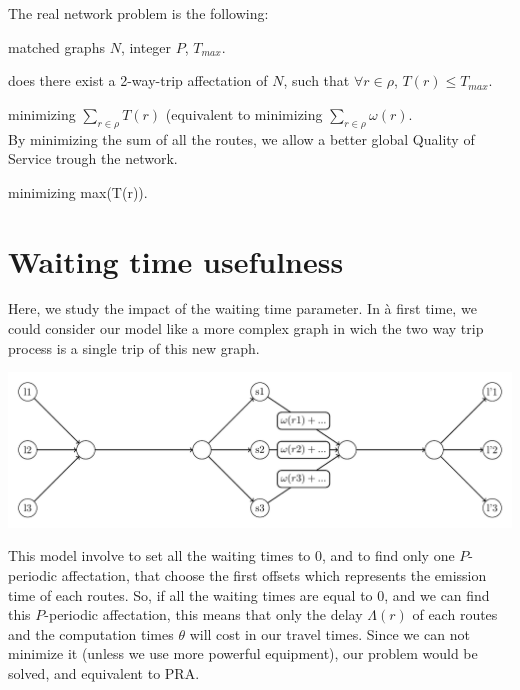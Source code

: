 \documentclass{article}
\begin{document}
The real network problem is the following:\\


 matched graphs $N$, integer $P$, $ T_{max}$.

 does there exist a 2-way-trip affectation of $N$, such that $\forall r \in \rho$, $T(r) \le T_{max}$.

 minimizing $\sum_{r \in \rho}  T(r)$ (equivalent to minimizing $\sum_{r \in \rho}  \omega(r)$.\\

By minimizing the sum of all the routes, we allow a better global Quality of Service trough the network.

 minimizing max(T(r)).\\



\section{Waiting time usefulness}

Here, we study the impact of the waiting time parameter. In à first time, we could consider our model like a more complex graph in wich the two way trip
process is a single trip of this new graph.

\begin{center}
 
\includegraphics[scale=0.7]{Fig9.pdf}\\

\end{center}

This model involve to set all the waiting times to 0, and to find only one $P$-periodic affectation, that choose the first offsets which represents the
emission time of each routes. So, if all the waiting times are equal to 0, and we can find this $P$-periodic affectation, this means that only the delay
$\Lambda(r)$ of each routes and the computation times $\theta$ will cost in our travel times. Since we can not minimize it (unless we use more powerful 
equipment), our problem would be solved, and equivalent to PRA.
\end{document}
